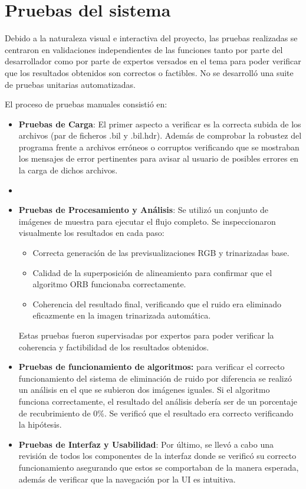 \section{Pruebas del sistema}
Debido a la naturaleza visual e interactiva del proyecto, las pruebas realizadas se centraron en validaciones independientes de las funciones tanto por parte del desarrollador como por parte de expertos versados en el tema para poder verificar que los resultados obtenidos son correctos o factibles. No se desarrolló una suite de pruebas unitarias automatizadas.

El proceso de pruebas manuales consistió en:
\begin{itemize}
\item \textbf{Pruebas de Carga}: El primer aspecto a verificar es la correcta subida de los archivos (par de ficheros .bil y .bil.hdr). Además de comprobar la robustez del programa frente a archivos erróneos o corruptos verificando que se mostraban los mensajes de error pertinentes para avisar al usuario de posibles errores en la carga de dichos archivos.
\item {}

 \item \textbf{Pruebas de Procesamiento y Análisis}: Se utilizó un conjunto de imágenes de muestra para ejecutar el flujo completo. Se inspeccionaron visualmente los resultados en cada paso:
\begin{itemize}
 \item Correcta generación de las previsualizaciones RGB y trinarizadas base.
 \item Calidad de la superposición de alineamiento para confirmar que el algoritmo ORB funcionaba correctamente.
\item Coherencia del resultado final, verificando que el ruido era eliminado eficazmente en la imagen trinarizada automática.
\end{itemize}
Estas pruebas fueron supervisadas por expertos para poder verificar la coherencia y factibilidad de los resultados obtenidos.

\item \textbf{Pruebas de funcionamiento de algoritmos:} para verificar el correcto funcionamiento del sistema de eliminación de  ruido por diferencia se realizó un análisis en el que se subieron dos imágenes iguales. Si el algoritmo funciona correctamente, el resultado del análisis debería ser de un porcentaje de recubrimiento de 0\%. Se verificó que el resultado era correcto verificando la hipótesis. 

\item \textbf{Pruebas de Interfaz y Usabilidad}: Por último, se llevó a cabo una revisión de todos los componentes de la interfaz donde se verificó su correcto funcionamiento asegurando que estos se comportaban de la manera esperada, además de verificar que la navegación por la UI es intuitiva.

\end{itemize}